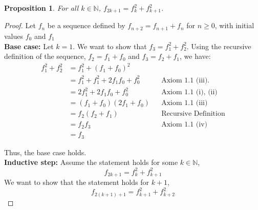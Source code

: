 \documentclass[12pt]{article}
\newtheorem{proposition}{Proposition}
\newcommand{\setpropnum}[1]{\renewcommand{\theproposition}{#1}}
\begin{document}
\setpropnum{4.31}
\begin{proposition}
  For all $k \in \mathbb{N}$, $f_{2k+1} = f_k^2 + f_{k+1}^2$.
\end{proposition}


\begin{proof}
  Let ${f_n}$ be a sequence defined by $f_{n+2} = f_{n+1} + f_n$ for $n \geq 0$, with initial values $f_0$ and $f_1$ \\

  \noindent \textbf{Base case:} Let $k=1$. We want to show that $f_3 = f_1^2 + f_2^2$. Using the recursive definition of the sequence, $f_2 = f_1 + f_0$ and $f_3 = f_2 + f_1$, we have:
  \begin{align*}
    f_1^2 + f_2^2 & = f_1^2 + (f_1 + f_0)^2                                            \\
                  & = f_1^2 + f_1^2 + 2f_1f_0 + f_0^2 &  & \text{Axiom 1.1 (iii).}     \\
                  & = 2f_1^2 + 2f_1f_0 + f_0^2        &  & \text{Axiom 1.1 (i), (ii)}  \\
                  & = (f_1 + f_0)(2f_1 + f_0)         &  & \text{Axiom 1.1 (iii)}      \\
                  & = f_2(f_2 + f_1)                  &  & \text{Recursive Definition} \\
                  & = f_2f_3                          &  & \text{Axiom 1.1 (iv)}       \\
                  & = f_3
  \end{align*}

  Thus, the base case holds. \\

  \noindent \textbf{Inductive step:} Assume the statement holds for some $k \in \mathbb{N}$,
  \[
    f_{2k+1} = f_k^2 + f_{k+1}^2
  \]
  We want to show that the statement holds for $k+1$,
  \[
    f_{2(k+1)+1} = f_{k+1}^2 + f_{k+2}^2
  \]


\end{proof}
\end{document}
